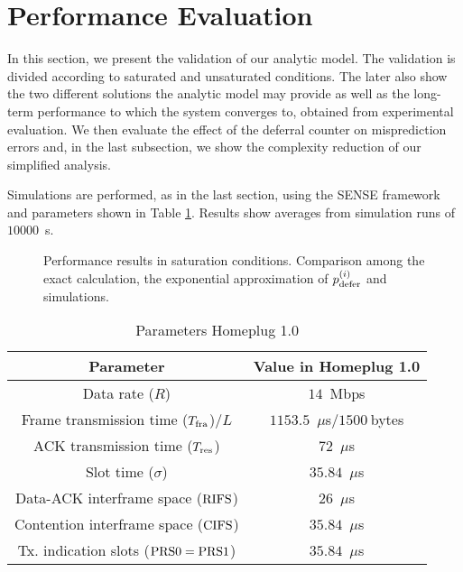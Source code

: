 \documentclass[preprint,12pt]{elsarticle}
\def\PRSzero    {\mbox{\rm PRS0}}
\def\PRSone    {\mbox{\rm PRS1}}
\begin{document}
\section{Performance Evaluation}\label{sec:validation}

In this section, we present the validation of our analytic model. The validation is divided according to saturated and unsaturated conditions. The later also show the two different solutions the analytic model may provide as well as the long-term performance to which the system converges to, obtained from experimental evaluation. We then evaluate the effect of the deferral counter on misprediction errors and, in the last subsection, we show the complexity reduction of our simplified analysis.

Simulations are performed, as in the last section, using the SENSE framework and parameters shown in Table \ref{tbl:parameters}. Results show averages from simulation runs of $10000$~s.

\begin{figure*}[ht!!!!!!!!!!]
\centering
{}
\caption{Performance results in saturation conditions. Comparison among the exact calculation, the exponential approximation of $p_{\rm defer}^{(i)}$ and simulations.}
\label{fig:sat}
\end{figure*}

\begin{table}
\centering
\begin{tabular}{cc} 
Parameter & Value in Homeplug 1.0\\ \hline
Data rate ($R$) & $14$~Mbps \\ \hline
Frame transmission time ($T_{\rm fra}$)/$L$ & $1153.5$~$\mu$s/$1500~$bytes \\\hline
ACK transmission time ($T_{\rm res}$) & $72$~$\mu$s \\ \hline
Slot time ($\sigma$) & $35.84$~$\mu$s \\ \hline
Data-ACK interframe space ($\rm{RIFS}$) & $26$~$\mu$s \\\hline
Contention interframe space ($\rm{CIFS}$) & $35.84$~$\mu$s \\ \hline
Tx. indication slots ($\PRSzero = \PRSone$) & $35.84$~$\mu$s \\ \hline
\end{tabular}
\caption{Parameters Homeplug 1.0}\label{tbl:parameters}
\end{table}
\end{document}
